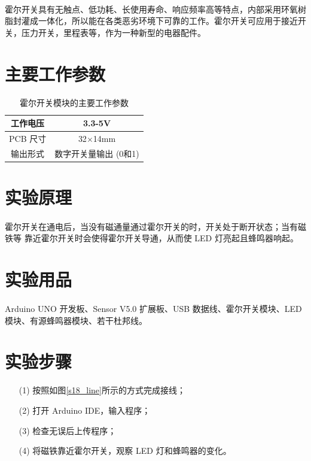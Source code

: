 \documentclass[UTF8, oneside]{ctexbook}
\begin{document}
\paragraph{}
霍尔开关具有无触点、低功耗、长使用寿命、响应频率高等特点，内部采用环氧树
脂封灌成一体化，所以能在各类恶劣环境下可靠的工作。霍尔开关可应用于接近开
关，压力开关，里程表等，作为一种新型的电器配件。

\section{主要工作参数}
\begin{table}[h]
    \centering
    \begin{tabular}{|c|c|}
    \hline
    工作电压   & 3.3-5V         \\ \hline
    PCB 尺寸 & 32$\times$14mm \\ \hline
    输出形式   & 数字开关量输出 (0和1)  \\ \hline
    \end{tabular}
    \caption{霍尔开关模块的主要工作参数}
\end{table}

\section{实验原理}
\paragraph{}
霍尔开关在通电后，当没有磁通量通过霍尔开关的时，开关处于断开状态；当有磁铁等
靠近霍尔开关时会使得霍尔开关导通，从而使 LED 灯亮起且蜂鸣器响起。

\section{实验用品}
\paragraph{}
Arduino UNO 开发板、Sensor V5.0 扩展板、USB 数据线、霍尔开关模块、LED 模块、有源蜂鸣器模块、若干杜邦线。

\section{实验步骤}
\begin{itemize}
    \item[(1)] 按照如图\ref{s18_line}所示的方式完成接线；
    \item[(2)] 打开 Arduino IDE，输入程序；
    \item[(3)] 检查无误后上传程序；
    \item[(4)] 将磁铁靠近霍尔开关，观察 LED 灯和蜂鸣器的变化。
\end{itemize}
\end{document}
